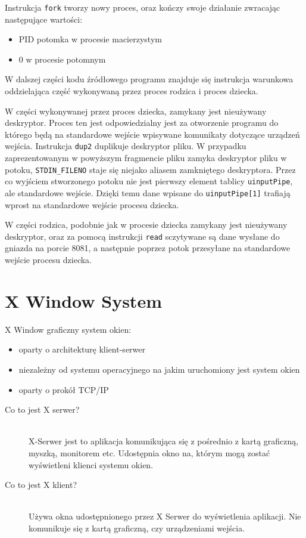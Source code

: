 \begin{appendices}
Instrukcja \lstinline|fork| tworzy nowy proces, oraz kończy swoje działanie zwracając następujące wartości:

\begin{itemize}
	\item PID potomka w procesie macierzystym
	\item 0 w procesie potomnym
\end{itemize}

W dalszej części kodu źródłowego programu znajduje się instrukcja warunkowa oddzielająca część wykonywaną przez proces rodzica i proces dziecka. 

W części wykonywanej przez proces dziecka, zamykany jest nieużywany deskryptor. Proces ten jest odpowiedzialny jest za otworzenie programu do którego będą na standardowe wejście wpisywane komunikaty dotyczące urządzeń wejścia. Instrukcja \lstinline{dup2} duplikuje deskryptor pliku. W przypadku zaprezentowanym w powyższym fragmencie pliku zamyka deskryptor pliku w potoku, \lstinline{STDIN_FILENO} staje się niejako aliasem zamkniętego deskryptora. Przez co wyjściem stworzonego potoku nie jest pierwszy element tablicy \lstinline{uinputPipe}, ale standardowe wejście. Dzięki temu dane wpisane do \lstinline{uinputPipe[1]} trafiają wprost na standardowe wejście procesu dziecka.

W części rodzica, podobnie jak w procesie dziecka zamykany jest nieużywany deskryptor, oraz za pomocą instrukcji \lstinline{read} sczytywane są dane wysłane do gniazda na porcie 8081, a następnie poprzez potok przesyłane na standardowe wejście procesu dziecka.
		


\newpage
\section{X Window System}
\label{app:X Window System}
X Window graficzny system okien:
\begin{itemize}
	\item oparty o architekturę klient-serwer
	\item niezależny od systemu operacyjnego na jakim uruchomiony jest system okien
	\item oparty o prokół TCP/IP
\end{itemize}

\begin{description}
	\item[Co to jest X serwer?] \hfill \\
		X-Serwer jest to aplikacja komunikująca się z pośrednio z kartą graficzną, myszką, monitorem etc. Udostępnia okno na, którym mogą zostać wyświetleni klienci systemu okien.
	\item[Co to jest X klient?] \hfill \\
Używa okna udostępnionego przez X Serwer do wyświetlenia aplikacji. Nie komunikuje się z kartą graficzną, czy urządzeniami wejścia.


\end{description}
\end{appendices}
